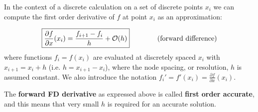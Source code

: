 \begin{center}

\end{center}

\noindent In the context of a discrete calculation on a set of discrete points $x_i$
we can compute the first order derivative of $f$ at point $x_i$ as an approximation:

\begin{equation}
\boxed{
\frac{\partial f}{\partial x}(x_i) = \frac{f_{i+1}-f_i}{h} + {\cal O}(h) 
}
\qquad
\qquad
\text{(forward difference)} 
\end{equation}
where functions $f_i = f (x_i)$ are evaluated at discretely spaced $x_i$ with $x_{i+1} = x_i + h$ 
(i.e. $h=x_{i+1}-x_i$), where the node spacing, or resolution, $h$ is assumed constant.
We also introduce the notation $f_i'=f'(x_i)=\frac{\partial f}{\partial x} (x_i)$. 


The {\bf forward FD derivative} as expressed above is called {\bf first order accurate},
and this means that very small $h$ is required for an accurate solution.

